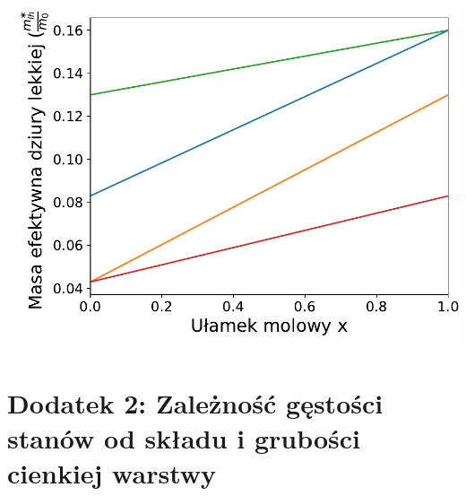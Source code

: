 \documentclass[12pt,openany,a4paper]{book}
\begin{document}
\begin{center}
\begin{minipage}[t]{0.5\textwidth}
	\includegraphics[width = \linewidth]{Figures/ternary/m_lh.pdf}\label{fig:ter_mlh}
\end{minipage}
\end{center}

\chapter*{Dodatek 2: Zależność gęstości stanów od składu i grubości cienkiej warstwy}\label{chapt:dodatek2}
\end{document}
